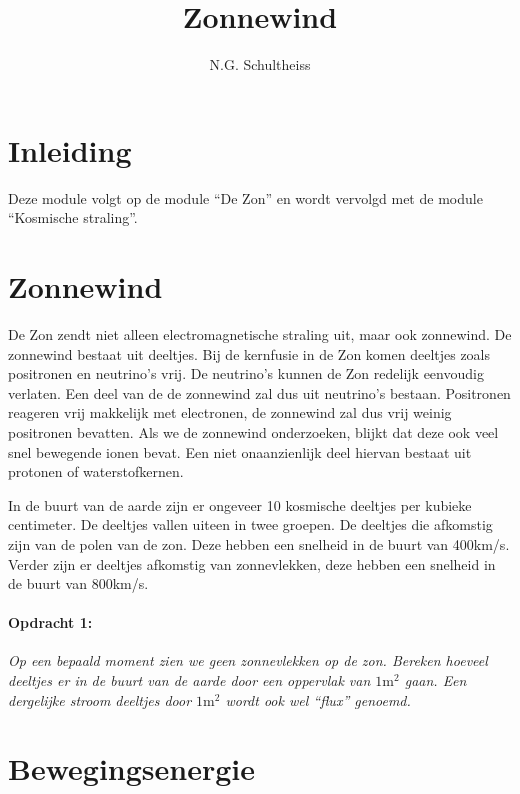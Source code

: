 



\title{Zonnewind}
\author{N.G. Schultheiss}
\date{}

\maketitle
\thispagestyle{firststyle}

\section{Inleiding}

Deze module volgt op de module ``De Zon'' en wordt vervolgd met
de module ``Kosmische straling''.


\section{Zonnewind}

De Zon zendt niet alleen electromagnetische straling uit, maar ook
zonnewind. De zonnewind bestaat uit deel\-tjes. Bij de kernfusie
in de Zon komen deeltjes zoals positronen en neutrino's vrij. De neutrino's
kunnen de Zon redelijk eenvoudig verlaten. Een deel van de de zonnewind
zal dus uit neutrino's bestaan. Positronen reageren vrij makkelijk
met electronen, de zonnewind zal dus vrij weinig positronen bevatten.
Als we de zonnewind onderzoeken, blijkt dat deze ook veel snel bewegende
ionen bevat. Een niet onaanzienlijk deel hiervan bestaat uit protonen
of waterstofkernen. 

In de buurt van de aarde zijn er ongeveer 10 kosmische deeltjes per
kubieke centimeter. De deeltjes vallen uiteen in twee groepen. De
deeltjes die afkomstig zijn van de polen van de zon. Deze hebben een
snelheid in de buurt van 400km/s. Verder zijn er deeltjes afkomstig
van zonnevlekken, deze hebben een snelheid in de buurt van 800km/s.


\paragraph*{Opdracht 1:}

\emph{Op een bepaald moment zien we geen zonnevlekken op de zon. Bereken
hoeveel deeltjes er in de buurt van de aarde door een oppervlak van
$1\mathrm{m}^{2}$ gaan. Een dergelijke stroom deeltjes door $1\mathrm{m}^{2}$
wordt ook wel ``flux'' genoemd.}


\section{Bewegingsenergie}


